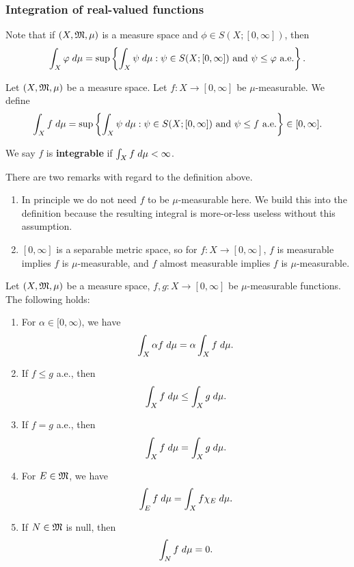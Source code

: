 \documentclass[a4paper]{article}
\begin{document}
\subsubsection{Integration of real-valued functions}

Note that if $(X, \mathfrak{M}, \mu)$ is a measure space and
$\phi \in S(X; [0, \infty])$, then
\[
\int_X \varphi \; d\mu =
\sup \left\{ \int_X \psi \; d\mu :
\psi \in S(X; [0, \infty]) \text{ and $\psi \leq \varphi$
a.e.} \right\}.
\]

\begin{defi}
  Let $(X, \mathfrak{M}, \mu)$ be a measure space. Let
  $f : X \to [0, \infty]$ be $\mu$-measurable. We
  define
  \[
  \int_X f \; d\mu =
  \sup \left\{ \int_X \psi \; d\mu:
  \text{$\psi \in S(X; [0, \infty])$ and
  $\psi \leq f$ a.e.} \right\}
  \in [0, \infty].
  \]

  We say $f$ is \textbf{integrable} if $\int_X f \; d \mu <
  \infty$.
\end{defi}

\begin{remark}
There are two remarks with regard to the definition
above.
\begin{enumerate}
  \item In principle we do not need $f$ to be $\mu$-measurable
  here. We build this into the definition because the
  resulting integral is more-or-less useless without this
  assumption.
  \item $[0, \infty]$ is a separable metric space,
  so for $f : X \to [0, \infty]$,
  $f$ is measurable implies $f$ is $\mu$-measurable,
  and $f$ almost measurable implies $f$ is $\mu$-measurable.
\end{enumerate}
\end{remark}

\begin{thm}
Let $(X, \mathfrak{M}, \mu)$ be a measure space, $f, g : X \to [0, \infty]$
be $\mu$-measurable functions. The following holds:
\begin{enumerate}
  \item For $\alpha \in [0, \infty)$, we have
  \[
  \int_X \alpha f \; d \mu = \alpha \int_X f \; d \mu.
  \]
  \item If $f \leq g$ a.e., then
  \[
  \int_X f \; d \mu \leq \int_X g \; d \mu.
  \]
  \item If $f = g$ a.e., then
  \[
  \int_X f \; d \mu = \int_X g \; d \mu.
  \]
  \item For $E \in \mathfrak{M}$, we have
  \[
  \int_E f \; d \mu = \int_X f \chi_E \; d \mu.
  \]
  \item If $N \in \mathfrak{M}$ is null, then
  \[
  \int_N f \; d \mu = 0.
  \]
\end{enumerate}
\end{thm}
\end{document}
